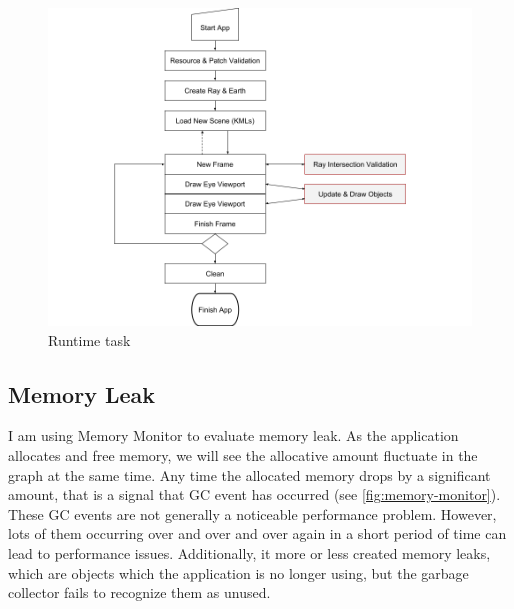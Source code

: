 \begin{figure}[H]
	\caption{Runtime task}
	\label{fig:runtime-task}
	\centering
	\includegraphics[width=\textwidth, keepaspectratio]{Figures/runtime-task.png}
	\decoRule
\end{figure}


\subsection{Memory Leak}

I am using Memory Monitor to evaluate memory leak. As the application allocates and free memory, we will see the allocative amount fluctuate in the graph at the same time. Any time the allocated memory drops by a significant amount, that is a signal that GC event has occurred (see \ref{fig:memory-monitor}). These GC events are not generally a noticeable performance problem. However, lots of them occurring over and over and over again in a short period of time can lead to performance issues. Additionally, it more or less created memory leaks, which are objects which the application is no longer using, but the garbage collector fails to recognize them as unused.

